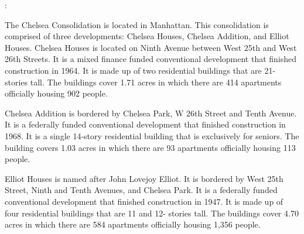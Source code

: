 :     

   

The Chelsea Consolidation is located in Manhattan. This consolidation is comprised of three developments: Chelsea Houses, Chelsea Addition, and Elliot Houses. Chelsea Houses is located on Ninth Avenue between West 25th and West 26th Streets. It is a mixed finance funded conventional development that finished construction in 1964. It is made up of two residential buildings that are 21- stories tall. The buildings cover 1.71 acres in which there are 414 apartments officially housing 902 people. 

Chelsea Addition is bordered by Chelsea Park, W 26th Street and Tenth Avenue. It is a federally funded conventional development that finished construction in 1968. It is a single 14-story residential building that is exclusively for seniors. The building covers 1.03 acres in which there are 93 apartments officially housing 113 people. 

Elliot Houses is named after John Lovejoy Elliot. It is bordered by West 25th Street, Ninth and Tenth Avenues, and Chelsea Park. It is a federally funded conventional development that finished construction in 1947. It is made up of four residential buildings that are 11 and 12- stories tall. The buildings cover 4.70 acres in which there are 584 apartments officially housing 1,356 people. 